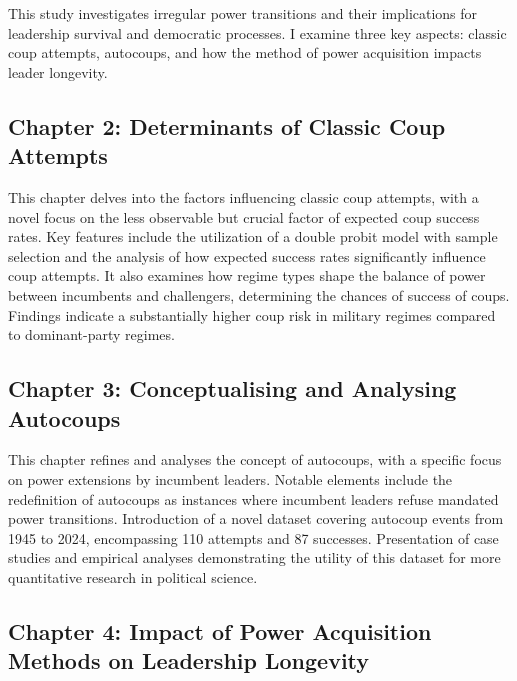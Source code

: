 \documentclass[
  12pt,
]{report}
\begin{document}
This study investigates irregular power transitions and their
implications for leadership survival and democratic processes. I examine
three key aspects: classic coup attempts, autocoups, and how the method
of power acquisition impacts leader longevity.

\subsection*{Chapter 2: Determinants of Classic Coup
Attempts}\label{chapter-2-determinants-of-classic-coup-attempts}

This chapter delves into the factors influencing classic coup attempts,
with a novel focus on the less observable but crucial factor of expected
coup success rates. Key features include the utilization of a double
probit model with sample selection and the analysis of how expected
success rates significantly influence coup attempts. It also examines
how regime types shape the balance of power between incumbents and
challengers, determining the chances of success of coups. Findings
indicate a substantially higher coup risk in military regimes compared
to dominant-party regimes.

\subsection*{Chapter 3: Conceptualising and Analysing
Autocoups}\label{chapter-3-conceptualising-and-analysing-autocoups}

This chapter refines and analyses the concept of autocoups, with a
specific focus on power extensions by incumbent leaders. Notable
elements include the redefinition of autocoups as instances where
incumbent leaders refuse mandated power transitions. Introduction of a
novel dataset covering autocoup events from 1945 to 2024, encompassing
110 attempts and 87 successes. Presentation of case studies and
empirical analyses demonstrating the utility of this dataset for more
quantitative research in political science.

\subsection*{Chapter 4: Impact of Power Acquisition Methods on
Leadership
Longevity}\label{chapter-4-impact-of-power-acquisition-methods-on-leadership-longevity}
\end{document}
